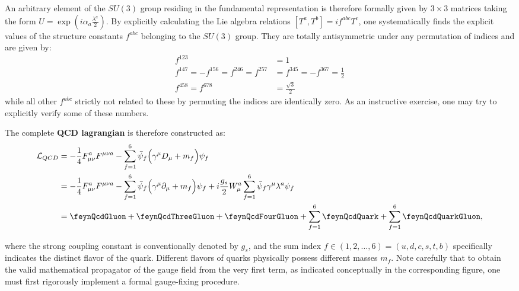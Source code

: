 An arbitrary element of the \(SU(3)\) group residing in the fundamental representation is therefore formally given by \(3 \times 3\) matrices taking the form \(U = \exp(i\alpha_a \frac{\lambda^a}{2})\). By explicitly calculating the Lie algebra relations \([T^a, T^b] = i f^{abc} T^c\), one systematically finds the explicit values of the structure constants \(f^{abc}\) belonging to the \(SU(3)\) group. They are totally antisymmetric under any permutation of indices and are given by:
\[
    \begin{aligned}
        f^{123}                                & = 1                                \\
        f^{147} = -f^{156} = f^{246} = f^{257} & = f^{345} = -f^{367} = \frac{1}{2} \\
        f^{458} = f^{678}                      & = \frac{\sqrt{3}}{2}
    \end{aligned}
\]
while all other \(f^{abc}\) strictly not related to these by permuting the indices are identically zero. As an instructive exercise, one may try to explicitly verify some of these numbers.

The complete \textbf{QCD lagrangian} is therefore constructed as:
\begin{equation} \label{eq:qcd_lagrangian}
    \begin{aligned}
        \mathcal{L}_{QCD} & = -\frac{1}{4} F_{\mu\nu}^a F^{\mu\nu a} - \sum_{f=1}^6 \bar{\psi}_f \Big(\gamma^\mu D_\mu + m_f\Big) \psi_f                                                                                       \\
                          & = -\frac{1}{4} F_{\mu\nu}^a F^{\mu\nu a} - \sum_{f=1}^6 \bar{\psi}_f \Big(\gamma^\mu \partial_\mu + m_f\Big) \psi_f + i\frac{g_s}{2} W_\mu^a \sum_{f=1}^6 \bar{\psi}_f \gamma^\mu \lambda^a \psi_f \\
                          & = \feynQcdGluon + \feynQcdThreeGluon + \feynQcdFourGluon + \sum_{f=1}^6 \feynQcdQuark + \sum_{f=1}^6 \feynQcdQuarkGluon,
    \end{aligned}
\end{equation}

where the strong coupling constant is conventionally denoted by \(g_s\), and the sum index \(f \in (1, 2, \dots, 6) = (u, d, c, s, t, b)\) specifically indicates the distinct flavor of the quark. Different flavors of quarks physically possess different masses \(m_f\). Note carefully that to obtain the valid mathematical propagator of the gauge field from the very first term, as indicated conceptually in the corresponding figure, one must first rigorously implement a formal gauge-fixing procedure.

